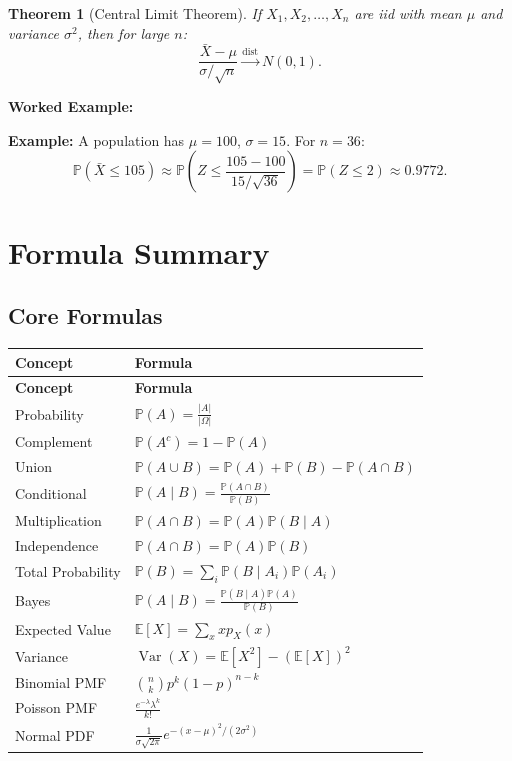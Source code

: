 \documentclass[12pt,a4paper,oneside]{report}
\theoremstyle{mytheorem}
\newtheorem{theorem}{Theorem}[chapter]
\theoremstyle{mydefinition}
\theoremstyle{myremark}
\newenvironment{worked}{%
  \par\medskip\noindent\textbf{\color{myorange}Worked Example:}\par\smallskip
}{%
  \par\medskip
}
\newcommand{\E}{\mathbb{E}}
\newcommand{\Prob}{\mathbb{P}}
\DeclareMathOperator{\Var}{Var}
\begin{document}
\begin{theorem}[Central Limit Theorem]
If $X_1, X_2, \ldots, X_n$ are iid with mean $\mu$ and variance $\sigma^2$, then for large $n$:
\[
\frac{\bar{X} - \mu}{\sigma/\sqrt{n}} \xrightarrow{\text{dist}} N(0,1).
\]
\end{theorem}

\begin{worked}
\textbf{Example:}
A population has $\mu = 100$, $\sigma = 15$. For $n = 36$:
\[
\Prob(\bar{X} \le 105) \approx \Prob\left(Z \le \frac{105-100}{15/\sqrt{36}}\right) = \Prob(Z \le 2) \approx 0.9772.
\]
\end{worked}

\appendix
\chapter{Formula Summary}
\section*{Core Formulas}
\begin{longtable}{p{4.5cm} p{9cm}}
\toprule
\textbf{Concept} & \textbf{Formula} \\
\midrule
\endfirsthead
\toprule
\textbf{Concept} & \textbf{Formula} \\
\midrule
\endhead
Probability & $\displaystyle \Prob(A)=\frac{|A|}{|\Omega|}$ \\[8pt]
Complement & $\displaystyle \Prob(A^c)=1-\Prob(A)$ \\[8pt]
Union & $\displaystyle \Prob(A\cup B)=\Prob(A)+\Prob(B)-\Prob(A\cap B)$ \\[8pt]
Conditional & $\displaystyle \Prob(A\mid B)=\frac{\Prob(A\cap B)}{\Prob(B)}$ \\[8pt]
Multiplication & $\displaystyle \Prob(A\cap B)=\Prob(A)\Prob(B\mid A)$ \\[8pt]
Independence & $\displaystyle \Prob(A\cap B)=\Prob(A)\Prob(B)$ \\[8pt]
Total Probability & $\displaystyle \Prob(B)=\sum_i \Prob(B\mid A_i)\Prob(A_i)$ \\[8pt]
Bayes & $\displaystyle \Prob(A\mid B)=\frac{\Prob(B\mid A)\Prob(A)}{\Prob(B)}$ \\[8pt]
Expected Value & $\displaystyle \E[X]=\sum_x x p_X(x)$ \\[8pt]
Variance & $\displaystyle \Var(X)=\E[X^2]-(\E[X])^2$ \\[8pt]
Binomial PMF & $\displaystyle \binom{n}{k}p^k(1-p)^{n-k}$ \\[8pt]
Poisson PMF & $\displaystyle \frac{e^{-\lambda}\lambda^k}{k!}$ \\[8pt]
Normal PDF & $\displaystyle \frac{1}{\sigma\sqrt{2\pi}}e^{-(x-\mu)^2/(2\sigma^2)}$ \\[8pt]
\bottomrule
\end{longtable}
\end{document}
